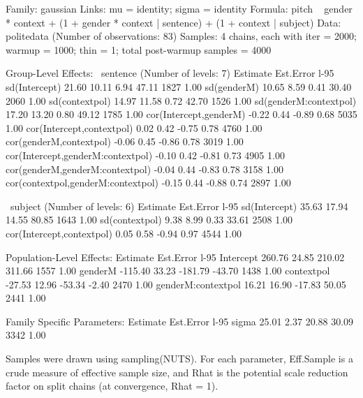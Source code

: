 \documentclass[nobib]{tufte-handout}
\begin{document}
\vspace{-0.5cm}

\begin{minipage}[]{1.5\textwidth}
\begin{rc}
 Family: gaussian 
  Links: mu = identity; sigma = identity 
Formula: pitch ~ gender * context + (1 + gender * context | sentence) + (1 + context | subject) 
   Data: politedata (Number of observations: 83) 
Samples: 4 chains, each with iter = 2000; warmup = 1000; thin = 1;
         total post-warmup samples = 4000

Group-Level Effects: 
~sentence (Number of levels: 7) 
                                   Estimate Est.Error l-95%
sd(Intercept)                         21.60     10.11     6.94    47.11       1827 1.00
sd(genderM)                           10.65      8.59     0.41    30.40       2060 1.00
sd(contextpol)                        14.97     11.58     0.72    42.70       1526 1.00
sd(genderM:contextpol)                17.20     13.20     0.80    49.12       1785 1.00
cor(Intercept,genderM)                -0.22      0.44    -0.89     0.68       5035 1.00
cor(Intercept,contextpol)              0.02      0.42    -0.75     0.78       4760 1.00
cor(genderM,contextpol)               -0.06      0.45    -0.86     0.78       3019 1.00
cor(Intercept,genderM:contextpol)     -0.10      0.42    -0.81     0.73       4905 1.00
cor(genderM,genderM:contextpol)       -0.04      0.44    -0.83     0.78       3158 1.00
cor(contextpol,genderM:contextpol)    -0.15      0.44    -0.88     0.74       2897 1.00

~subject (Number of levels: 6) 
                          Estimate Est.Error l-95%
sd(Intercept)                35.63     17.94    14.55    80.85       1643 1.00
sd(contextpol)                9.38      8.99     0.33    33.61       2508 1.00
cor(Intercept,contextpol)     0.05      0.58    -0.94     0.97       4544 1.00

Population-Level Effects: 
                   Estimate Est.Error l-95%
Intercept            260.76     24.85   210.02   311.66       1557 1.00
genderM             -115.40     33.23  -181.79   -43.70       1438 1.00
contextpol           -27.53     12.96   -53.34    -2.40       2470 1.00
genderM:contextpol    16.21     16.90   -17.83    50.05       2441 1.00

Family Specific Parameters: 
      Estimate Est.Error l-95%
sigma    25.01      2.37    20.88    30.09       3342 1.00

Samples were drawn using sampling(NUTS). For each parameter, Eff.Sample 
is a crude measure of effective sample size, and Rhat is the potential 
scale reduction factor on split chains (at convergence, Rhat = 1).
\end{rc}
\end{minipage}
\end{document}
